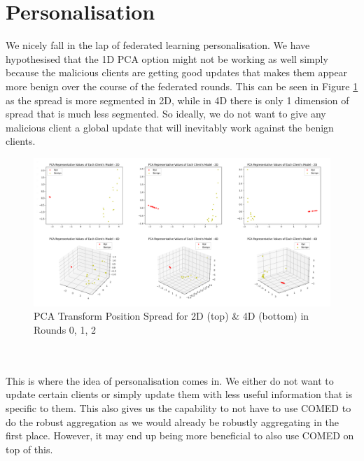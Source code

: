 \section{Personalisation}
We nicely fall in the lap of federated learning personalisation.
We have hypothesised that the 1D PCA option might not be working as well simply because the malicious clients are getting good updates that makes them appear more benign over the course of the federated rounds.
This can be seen in Figure \ref{fig:mal_spread} as the spread is more segmented in 2D, while in 4D there is only 1 dimension of spread that is much less segmented.
So ideally, we do not want to give any malicious client a global update that will inevitably work against the benign clients.
\begin{figure}[htbp]
	\centering
    \includegraphics[scale=0.24]{my_agg/graphs/mal_spread.png}
	\caption{PCA Transform Position Spread for 2D (top) \& 4D (bottom) in Rounds 0, 1, 2}
	\label{fig:mal_spread}
\end{figure}
\\ \\
This is where the idea of personalisation comes in.
We either do not want to update certain clients or simply update them with less useful information that is specific to them.
This also gives us the capability to not have to use COMED to do the robust aggregation as we would already be robustly aggregating in the first place.
However, it may end up being more beneficial to also use COMED on top of this.



